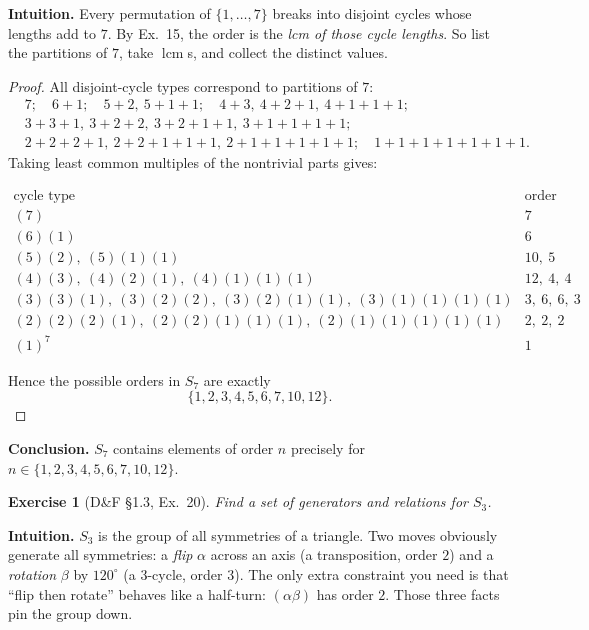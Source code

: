 \documentclass[12pt]{article}
\newtheorem{exercise}[theorem]{Exercise}
\theoremstyle{definition}
\begin{document}
\dotfill

\noindent\textbf{Intuition.}
Every permutation of $\{1,\dots,7\}$ breaks into disjoint cycles whose lengths add to $7$.
By Ex.~15, the order is the \emph{lcm of those cycle lengths}. So list the partitions of $7$,
take $\operatorname{lcm}$s, and collect the distinct values.

\dotfill

\begin{proof}
All disjoint-cycle types correspond to partitions of $7$:
\[
\begin{aligned}
&7;\quad 6+1;\quad 5+2,\ 5+1+1;\quad 4+3,\ 4+2+1,\ 4+1+1+1;\\
&3+3+1,\ 3+2+2,\ 3+2+1+1,\ 3+1+1+1+1;\\
&2+2+2+1,\ 2+2+1+1+1,\ 2+1+1+1+1+1;\quad 1+1+1+1+1+1+1.
\end{aligned}
\]
Taking least common multiples of the nontrivial parts gives:

\[
\begin{array}{c|c}
\text{cycle type} & \text{order} \\ \hline
(7) & 7\\
(6)(1) & 6\\
(5)(2),\ (5)(1)(1) & 10,\ 5\\
(4)(3),\ (4)(2)(1),\ (4)(1)(1)(1) & 12,\ 4,\ 4\\
(3)(3)(1),\ (3)(2)(2),\ (3)(2)(1)(1),\ (3)(1)(1)(1)(1) & 3,\ 6,\ 6,\ 3\\
(2)(2)(2)(1),\ (2)(2)(1)(1)(1),\ (2)(1)(1)(1)(1)(1) & 2,\ 2,\ 2\\
(1)^7 & 1
\end{array}
\]

Hence the possible orders in $S_{7}$ are exactly
\[
\{1,2,3,4,5,6,7,10,12\}.
\]
\end{proof}

\textbf{Conclusion.} $S_{7}$ contains elements of order $n$ precisely for $n\in\{1,2,3,4,5,6,7,10,12\}$. \qedhere

\newpage

\begin{exercise}[D\&F §1.3, Ex.~20]
Find a set of generators and relations for $S_{3}$.
\end{exercise}

\dotfill

\noindent\textbf{Intuition.}
$S_{3}$ is the group of all symmetries of a triangle. Two moves obviously generate all symmetries:
a \emph{flip} $\alpha$ across an axis (a transposition, order $2$) and a \emph{rotation} $\beta$ by $120^\circ$
(a $3$-cycle, order $3$). The only extra constraint you need is that “flip then rotate” behaves like a
half-turn: $(\alpha\beta)$ has order $2$. Those three facts pin the group down.
\end{document}
